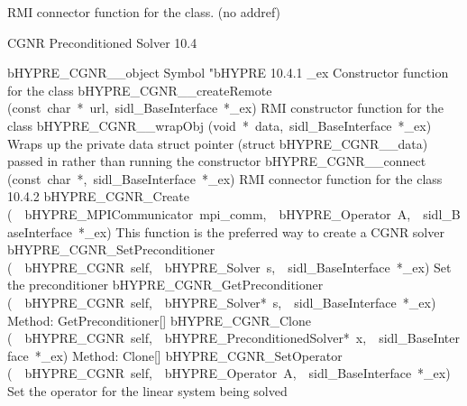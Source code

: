 \documentclass{article}
\begin{document}
\begin{cxxentry}
\begin{cxxentry}
\begin{cxxvariable}
\begin{cxxdoc}
RMI connector function for the class. (no addref)
\end{cxxdoc}
\end{cxxvariable}
\end{cxxentry}
\begin{cxxentry}
{}
        {CGNR Preconditioned Solver}
        {}
        {
}
        {10.4}
\begin{cxxnames}
        {bHYPRE\_CGNR\_\_object}
        {}
        {
Symbol "bHYPRE}
        {10.4.1}
        {\_ex}
        {}
        {
Constructor function for the class}
        {}
\label{cxx.10.4.11}
        {bHYPRE\_CGNR\_\_createRemote}
        {(const\ char\ *\ url,\ sidl\_BaseInterface\ *\_ex)}
        {
RMI constructor function for the class}
        {}
\label{cxx.10.4.12}
        {bHYPRE\_CGNR\_\_wrapObj}
        {(void\ *\ data,\ sidl\_BaseInterface\ *\_ex)}
        {
Wraps up the private data struct pointer (struct bHYPRE\_CGNR\_\_data) passed in rather than running the constructor}
        {}
\label{cxx.10.4.13}
        {bHYPRE\_CGNR\_\_connect}
        {(const\ char\ *,\ sidl\_BaseInterface\ *\_ex)}
        {
RMI connector function for the class}
        {10.4.2}
        {bHYPRE\_CGNR\_Create}
        {(\ \ bHYPRE\_MPICommunicator\ mpi\_comm,\ \ bHYPRE\_Operator\ A,\ \ sidl\_BaseInterface\ *\_ex)}
        {
This function is the preferred way to create a CGNR solver}
        {}
\label{cxx.10.4.14}
        {bHYPRE\_CGNR\_SetPreconditioner}
        {(\ \ bHYPRE\_CGNR\ self,\ \ bHYPRE\_Solver\ s,\ \ sidl\_BaseInterface\ *\_ex)}
        {
Set the preconditioner}
        {}
\label{cxx.10.4.15}
        {bHYPRE\_CGNR\_GetPreconditioner}
        {(\ \ bHYPRE\_CGNR\ self,\ \ bHYPRE\_Solver*\ s,\ \ sidl\_BaseInterface\ *\_ex)}
        {
Method:  GetPreconditioner[]}
        {}
\label{cxx.10.4.16}
        {bHYPRE\_CGNR\_Clone}
        {(\ \ bHYPRE\_CGNR\ self,\ \ bHYPRE\_PreconditionedSolver*\ x,\ \ sidl\_BaseInterface\ *\_ex)}
        {
Method:  Clone[]}
        {}
\label{cxx.10.4.17}
        {bHYPRE\_CGNR\_SetOperator}
        {(\ \ bHYPRE\_CGNR\ self,\ \ bHYPRE\_Operator\ A,\ \ sidl\_BaseInterface\ *\_ex)}
        {
Set the operator for the linear system being solved}

\end{cxxnames}
\end{cxxentry}
\end{cxxentry}
\end{document}
